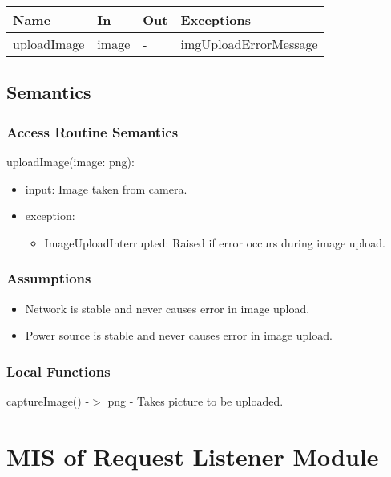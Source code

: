 \documentclass[12pt, titlepage]{article}
\begin{document}
\begin{center}
\begin{tabular}{p{3cm} p{2cm} p{2cm} p{5cm}}
\hline
\textbf{Name} & \textbf{In} & \textbf{Out} & \textbf{Exceptions} \\
\hline
uploadImage & image & - & imgUploadErrorMessage \\
\hline
\end{tabular}
\end{center}

\subsection{Semantics}


\subsubsection{Access Routine Semantics}

\noindent uploadImage(image: png):
\begin{itemize}
\item input: Image taken from camera. 
\item exception: 
	\begin{itemize}
		\item ImageUploadInterrupted: Raised if error occurs during image upload.
	\end{itemize} 
\end{itemize}

\subsubsection{Assumptions}
\begin{itemize}
	\item Network is stable and never causes error in image upload.
	\item Power source is stable and never causes error in image upload.
\end{itemize}

\subsubsection{Local Functions}

captureImage() -$>$ png - Takes picture to be uploaded.

\newpage

\section{MIS of Request Listener Module} \label{Module} 
\end{document}
